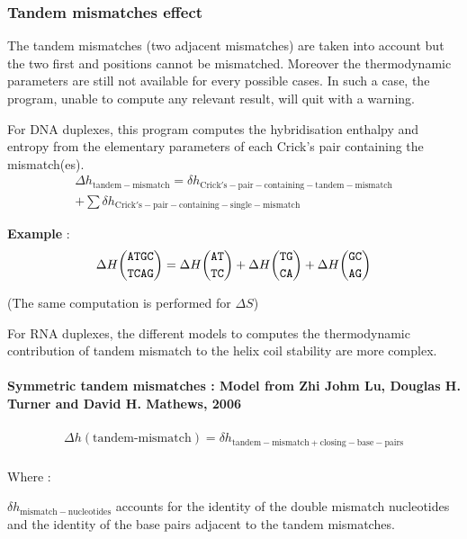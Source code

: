 \documentclass{article}
\begin{document}
\subsubsection{Tandem mismatches effect}

The tandem mismatches (two adjacent mismatches) are taken into account but the two first and positions cannot
be mismatched. Moreover the thermodynamic parameters are still not available for every possible cases.
In such a case, the program, unable to compute any relevant result, will quit with a warning.

For DNA duplexes, this program computes the hybridisation enthalpy and entropy from the elementary 
parameters of each Crick's pair containing the mismatch(es). 
\begin{multline*}
\Delta{}h_\mathrm{tandem-mismatch} =
\delta{}h_\mathrm{Crick's-pair-containing-tandem-mismatch} \\ + 
\sum \delta{}h_\mathrm{Crick's-pair-containing-single-mismatch}
\end{multline*}


\textbf{Example} :
\begin{multline*}
\Delta H {\mbox{\texttt{ATGC}} \choose \mbox{\texttt{TCAG}}} = 
\Delta H {\mbox{\texttt{AT}} \choose \mbox{\texttt{TC}} } + 
\Delta H {\mbox{\texttt{TG}} \choose \mbox{\texttt{CA}} } + 
\Delta H {\mbox{\texttt{GC}} \choose \mbox{\texttt{AG}} } \\
\end{multline*}

       (The same computation is performed for $\Delta S$) 

For RNA duplexes, the different models to computes the thermodynamic contribution of tandem mismatch to the helix coil 
stability are more complex.

\paragraph{Symmetric tandem mismatches : \textbf{Model from Zhi Johm Lu, Douglas H. Turner and David H. Mathews, 2006}}

\begin{multline*}
\Delta h {(\mbox{tandem-mismatch})} = 
\delta{}h_\mathrm{tandem-mismatch+closing-base-pairs} \\
\end{multline*}

Where :

$\delta{}h_\mathrm{mismatch-nucleotides}$ accounts for the identity of the double mismatch nucleotides and the identity of the base pairs
adjacent to the tandem mismatches.
\end{document}
